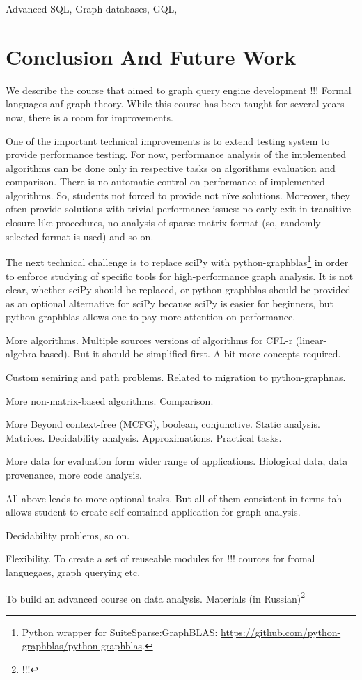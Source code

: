 \documentclass[sigconf]{acmart}
\begin{document}
Advanced SQL, Graph databases, GQL, 

\section{Conclusion And Future Work}

We describe the course that aimed to graph query engine development !!! 
Formal languages anf graph theory.
While this course has been taught for several years now, there is a room for improvements.

One of the important technical improvements is to extend testing system to provide performance testing. 
For now, performance analysis of the implemented algorithms can be done only in respective tasks on algorithms evaluation and comparison.
There is no automatic control on performance of implemented algorithms. 
So, students not forced to provide not n\"ive solutions.
Moreover, they often provide solutions with trivial performance issues: no early exit in transitive-closure-like procedures, no analysis of sparse matrix format (so, randomly selected format is used) and so on.

The next technical challenge is to replace sciPy with python-graphblas\footnote{Python wrapper for SuiteSparse:GraphBLAS: \url{https://github.com/python-graphblas/python-graphblas}.} in order to enforce studying of specific tools for high-performance graph analysis. 
It is not clear, whether sciPy should be replaced, or python-graphblas should be provided as an optional alternative for sciPy because sciPy is easier for beginners, but python-graphblas allows one to pay more attention on performance.

More algorithms.
Multiple sources versions of algorithms for CFL-r (linear-algebra based).
But it should be simplified first.
A bit more concepts required.

Custom semiring and path problems.
Related to migration to python-graphnas.

More non-matrix-based algorithms. Comparison.

More Beyond context-free (MCFG), boolean, conjunctive. 
Static analysis.
Matrices. 
Decidability analysis. Approximations.
Practical tasks.

More data for evaluation form wider range of applications.
Biological data, data provenance, more code analysis.

All above leads to more optional tasks.
But all of them consistent in terms tah allows student to create self-contained application for graph analysis.

Decidability problems, so on.

Flexibility. 
To create a set of reuseable modules for !!! cources for fromal languegaes, graph querying etc.

To build an advanced course on data analysis. 
Materials (in Russian)\footnote{!!!}



\end{document}
